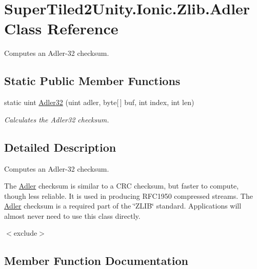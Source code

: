\hypertarget{class_super_tiled2_unity_1_1_ionic_1_1_zlib_1_1_adler}{}\section{Super\+Tiled2\+Unity.\+Ionic.\+Zlib.\+Adler Class Reference}
\label{class_super_tiled2_unity_1_1_ionic_1_1_zlib_1_1_adler}


Computes an Adler-\/32 checksum.  


\subsection*{Static Public Member Functions}
\begin{DoxyCompactItemize}
\item 
static uint \mbox{\hyperlink{class_super_tiled2_unity_1_1_ionic_1_1_zlib_1_1_adler_a75caabf7b41a8f3bddc00e2c9027b551}{Adler32}} (uint adler, byte\mbox{[}$\,$\mbox{]} buf, int index, int len)
\begin{DoxyCompactList}\small\item\em Calculates the Adler32 checksum. \end{DoxyCompactList}\end{DoxyCompactItemize}


\subsection{Detailed Description}
Computes an Adler-\/32 checksum. 

The \mbox{\hyperlink{class_super_tiled2_unity_1_1_ionic_1_1_zlib_1_1_adler}{Adler}} checksum is similar to a C\+RC checksum, but faster to compute, though less reliable. It is used in producing R\+F\+C1950 compressed streams. The \mbox{\hyperlink{class_super_tiled2_unity_1_1_ionic_1_1_zlib_1_1_adler}{Adler}} checksum is a required part of the \char`\"{}\+Z\+L\+I\+B\char`\"{} standard. Applications will almost never need to use this class directly. 

$<$exclude$>$ 

\subsection{Member Function Documentation}
\mbox{\label{class_super_tiled2_unity_1_1_ionic_1_1_zlib_1_1_adler_a75caabf7b41a8f3bddc00e2c9027b551}} 
